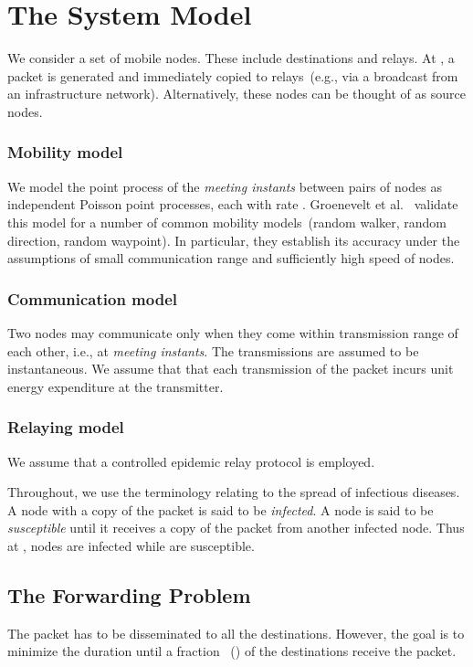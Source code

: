 \documentclass[10pt,journal,letterpaper]{IEEEtran}
\begin{document}
\section{The System Model}
\label{sec:sys-model}
We consider a set of  mobile nodes. These include 
destinations and  relays. At , a packet is generated and
immediately copied to  relays~(e.g., via a broadcast from an infrastructure
network). Alternatively, these  nodes can be thought of
as source nodes.

\subsubsection{Mobility model}
We model the point process of the {\it meeting instants} between pairs of nodes as independent Poisson point processes, each with rate . Groenevelt et al.~\cite{comnet-dtn.groenevelt-etal05message-delay-mobile-networks} validate this model for a number of common mobility models~(random walker, random direction, random waypoint). In particular, they establish its accuracy under the assumptions of small communication range and sufficiently high speed of nodes.

\subsubsection{Communication model}
Two nodes may communicate only when they come within transmission
range of each other, i.e., at {\it meeting instants}.
The transmissions are assumed to be instantaneous. We assume that
that each transmission of the packet incurs unit energy expenditure
at the transmitter.

\subsubsection{Relaying model}
We assume that a controlled epidemic relay protocol is employed.

Throughout, we use the terminology relating to the spread of
infectious diseases. A node with a copy of the packet is said to be
{\it infected}. A node is said to be {\it susceptible} until it receives a copy
of the packet from another infected node. Thus at ,  
nodes are infected while  are susceptible.

\subsection{The Forwarding Problem}
\label{sec:forward-problem} The packet has to be disseminated to all
the  destinations. However, the goal is to minimize the duration
until a fraction ~() of the
destinations receive the packet.
\end{document}
